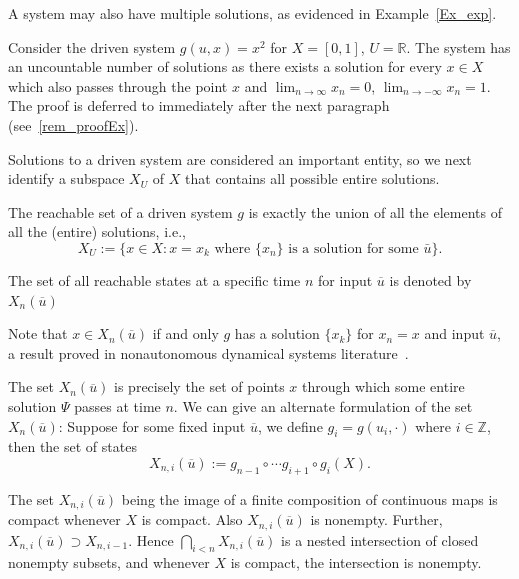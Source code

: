 A system may also have multiple solutions, as evidenced in Example~\ref{Ex_exp}.

\begin{Example}\label{Ex_exp}\rm 
  Consider the driven system $g(u,x)=x^2$ for $X=[0,1]$, $U=\mathbb{R}$. The system has an uncountable number of solutions as there exists a solution for every $x\in{X}$ which also passes through the point $x$ and $\lim_{n\to\infty}x_n=0$, $\lim_{n\to{-}\infty}x_n=1$.  
 The proof is deferred to immediately after the next paragraph (see~\ref{rem_proofEx}).
\end{Example}

Solutions to a driven system are considered an important entity, so we next identify a subspace $X_U$ of $X$ that contains all possible entire solutions. 

\begin{Definition}
  \label{Dfn_ReachableSet}\rm
The reachable set of a driven system $g$ is exactly the union of all the elements of all the (entire) solutions, i.e., 
\begin{equation}
  X_U :=\Big \{x \in X:  x = x_k \mbox{ where  $\{x_n\}$  is a solution for some  $\bar{u}$} \Big \}.  
\end{equation}

The set of all reachable states at a specific time $n$ for input $\overline{u}$ is denoted by $X_n(\overline{u})$
\end{Definition}

Note that $x\in{X_n(\overline{u})}$ if and only $g$ has a solution $\{x_k\}$ for $x_n=x$ and input $\overline{u}$, a result proved in nonautonomous dynamical systems literature~\cite{manjunath2014dynamics, manjunath2013echo}.

The set $X_n(\overline{u})$ is precisely the set of points $x$ through which some entire solution $\Psi$ passes at time $n$. We can give an alternate formulation of the set $X_n(\overline{u})$: 
Suppose for some fixed input 
$\overline{u}$, we define $g_i = g(u_i,\cdot)$ where $i\in \mathbb{Z}$, then the set of states
\begin{equation} \label{eqn_association}
X_{n,i}(\overline{u}) := g_{n-1} \circ \cdots g_{i+1} \circ g_i(X).
\end{equation}

The set $X_{n,i}(\overline{u})$ being the image of a finite composition of
continuous maps is compact whenever $X$ is compact. Also $X_{n,i}(\overline{u})$ is
nonempty.  Further, $X_{n,i}(\overline{u}) \supset X_{n,i-1}$. Hence $\bigcap_{i<n}
X_{n,i}(\overline{u})$ is a nested intersection of closed nonempty subsets, and
whenever $X$ is compact, the intersection is nonempty.

